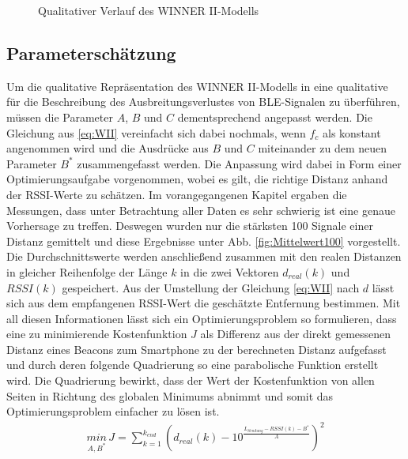 \begin{figure}[H]
\centering
{}
\caption{Qualitativer Verlauf des WINNER II-Modells}
\label{fig:QualiWII}
\end{figure}
\subsection{Parameterschätzung}
Um die qualitative Repräsentation des WINNER II-Modells in eine qualitative für die Beschreibung des Ausbreitungsverlustes von BLE-Signalen zu überführen, müssen die Parameter $A$, $B$ und $C$ dementsprechend angepasst werden. Die Gleichung aus \ref{eq:WII} vereinfacht sich dabei nochmals, wenn $f_c$ als konstant angenommen wird und die Ausdrücke aus $B$ und $C$ miteinander zu dem neuen Parameter $B^{\ast}$ zusammengefasst werden. Die Anpassung wird dabei in Form einer Optimierungsaufgabe vorgenommen, wobei es gilt, die richtige Distanz anhand der RSSI-Werte zu schätzen. Im vorangegangenen Kapitel ergaben die Messungen, dass unter Betrachtung aller Daten es sehr schwierig ist eine genaue Vorhersage zu treffen. Deswegen wurden nur die stärksten 100 Signale einer Distanz gemittelt und diese Ergebnisse unter Abb. \ref{fig:Mittelwert100} vorgestellt. Die Durchschnittswerte werden anschließend zusammen mit den realen Distanzen in gleicher Reihenfolge der Länge $k$ in die zwei Vektoren $d_{real}\left ( k \right )$ und $RSSI\left ( k \right )$ gespeichert. Aus der Umstellung der Gleichung \ref{eq:WII} nach $d$ lässt sich aus dem empfangenen RSSI-Wert die geschätzte Entfernung bestimmen. Mit all diesen Informationen lässt sich ein Optimierungsproblem so formulieren, dass eine zu minimierende Kostenfunktion $J$ als Differenz aus der direkt gemessenen Distanz eines Beacons zum Smartphone zu der berechneten Distanz aufgefasst und durch deren folgende Quadrierung so eine parabolische Funktion erstellt wird. Die Quadrierung bewirkt, dass der Wert der Kostenfunktion von allen Seiten in Richtung des globalen Minimums abnimmt und somit das Optimierungsproblem einfacher zu lösen ist. 
\begin{align}
\underset{A,B^{\ast}}{min}\, J=\sum_{k=1}^{k_{end}}\left ( d_{real}\left ( k \right ) -10^{\frac{L_{Sendung} - RSSI\left ( k \right ) - B^{\ast}}{A}} \right )^{2} \label{eq:WIIOpti}
\end{align}
